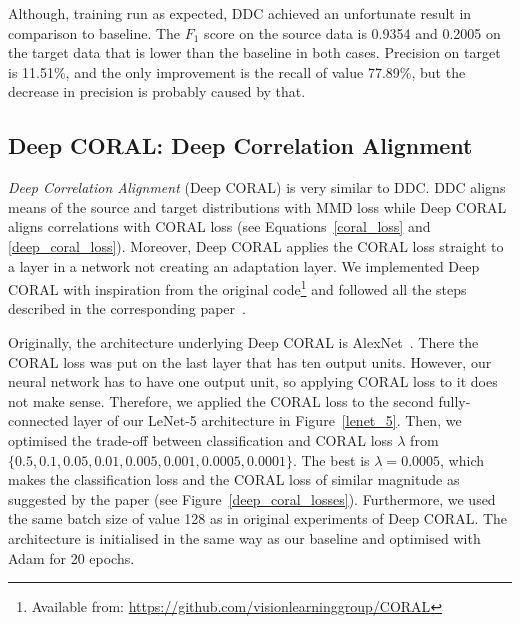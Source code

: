 Although, training run as expected,
DDC achieved an unfortunate result in comparison to baseline.
The \(F_1\) score on the source data is 0.9354 and 0.2005 on the target data that is lower than the baseline in both cases.
Precision on target is 11.51\%,
and the only improvement is the recall of value 77.89\%,
but the decrease in precision is probably caused by that.

\subsection{Deep CORAL: Deep Correlation Alignment}

\textit{Deep Correlation Alignment} (Deep CORAL) is very similar to DDC.
DDC aligns means of the source and target distributions with MMD loss
while Deep CORAL aligns correlations with CORAL loss
(see Equations~\ref{coral_loss} and \ref{deep_coral_loss}).
Moreover, Deep CORAL applies the CORAL loss straight to a layer in a network
not creating an adaptation layer.
We implemented Deep CORAL with inspiration from the original
code\footnote{Available from: \url{https://github.com/visionlearninggroup/CORAL}}
and followed all the steps described in the corresponding paper~\cite{sun2016}.

Originally, the architecture underlying Deep CORAL is AlexNet~\cite{krizhevsky2012}.
There the CORAL loss was put on the last layer that has ten output units.
However, our neural network has to have one output unit,
so applying CORAL loss to it does not make sense.
Therefore, we applied the CORAL loss to the second fully-connected layer
of our LeNet-5 architecture in Figure~\ref{lenet_5}.
Then, we optimised the trade-off between classification and CORAL loss
\(\lambda\) from \(\{0.5, 0.1, 0.05, 0.01, 0.005, 0.001, 0.0005, 0.0001\}\).
The best is \(\lambda = 0.0005\),
which makes the classification loss and the CORAL loss of similar magnitude as suggested by the paper
(see Figure~\ref{deep_coral_losses}).
Furthermore, we used the same batch size of value 128
as in original experiments of Deep CORAL.
The architecture is initialised in the same way as our baseline
and optimised with Adam for 20 epochs.

